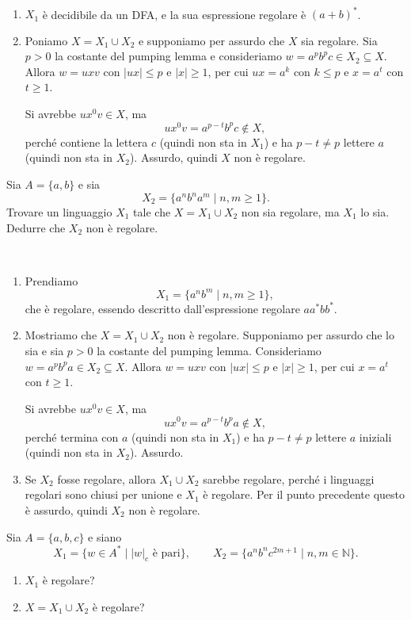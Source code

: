 \begin{sol}\
\begin{enumerate}
\item $X_1$ è decidibile da un DFA, e la sua espressione regolare è $(a+b)^*$.
\item Poniamo $X=X_1\cup X_2$ e supponiamo per assurdo che $X$ sia regolare. Sia $p>0$ la costante del pumping lemma e consideriamo $w=a^pb^pc\in X_2\subseteq X$. Allora $w=uxv$ con $|ux|\le p$ e $|x|\ge1$, per cui $ux=a^k$ con $k\le p$ e $x=a^t$ con $t\ge1$.

Si avrebbe $ux^0v\in X$, ma
\[
ux^0v=a^{p-t}b^pc\notin X,
\]
perché contiene la lettera $c$ (quindi non sta in $X_1$) e ha $p-t\neq p$ lettere $a$ (quindi non sta in $X_2$). Assurdo, quindi $X$ non è regolare.
\end{enumerate}
\end{sol}

\newpage

\begin{ex}
Sia $A=\{a,b\}$ e sia
\[
X_2=\{a^nb^na^m\mid n,m\ge1\}.
\]
Trovare un linguaggio $X_1$ tale che $X=X_1\cup X_2$ non sia regolare, ma $X_1$ lo sia. Dedurre che $X_2$ non è regolare.
\end{ex}

\begin{sol}\
\begin{enumerate}
\item Prendiamo
\[
X_1=\{a^nb^m\mid n,m\ge1\},
\]
che è regolare, essendo descritto dall'espressione regolare $aa^*bb^*$.
\item Mostriamo che $X=X_1\cup X_2$ non è regolare. Supponiamo per assurdo che lo sia e sia $p>0$ la costante del pumping lemma. Consideriamo $w=a^pb^pa\in X_2\subseteq X$. Allora $w=uxv$ con $|ux|\le p$ e $|x|\ge1$, per cui $x=a^t$ con $t\ge1$.

Si avrebbe $ux^0v\in X$, ma
\[
ux^0v=a^{p-t}b^pa\notin X,
\]
perché termina con $a$ (quindi non sta in $X_1$) e ha $p-t\neq p$ lettere $a$ iniziali (quindi non sta in $X_2$). Assurdo.
\item Se $X_2$ fosse regolare, allora $X_1\cup X_2$ sarebbe regolare, perché i linguaggi regolari sono chiusi per unione e $X_1$ è regolare. Per il punto precedente questo è assurdo, quindi $X_2$ non è regolare.
\end{enumerate}
\end{sol}

\newpage

\begin{ex}
Sia $A=\{a,b,c\}$ e siano
\[
X_1=\{w\in A^*\mid |w|_c\text{ è pari}\},\qquad X_2=\{a^nb^nc^{2m+1}\mid n,m\in\mathbb N\}.
\]
\begin{enumerate}
\item $X_1$ è regolare?
\item $X=X_1\cup X_2$ è regolare?
\end{enumerate}
\end{ex}

